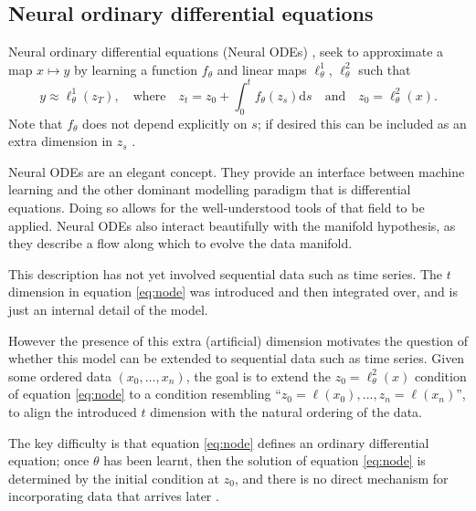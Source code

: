 \documentclass{article}
\theoremstyle{plain}
\theoremstyle{definition}
\begin{document}
	\subsection{Neural ordinary differential equations}
	Neural ordinary differential equations (Neural ODEs) \cite{E2017, neural-odes}, seek to approximate a map $x \mapsto y$ by learning a function $f_\theta$ and linear maps $\ell^1_\theta$, $\ell^2_\theta$ such that
	\begin{equation}\label{eq:node}
	y \approx \ell^1_\theta(z_T),\quad\text{where}\quad z_t = z_0 + \int_0^t f_\theta(z_s) \mathrm{d} s\quad\text{and}\quad z_0 = \ell^2_\theta(x).
	\end{equation}
	Note that $f_\theta$ does not depend explicitly on $s$; if desired this can be included as an extra dimension in $z_s$ \cite[Appendix B.2]{neural-odes}.
	
	Neural ODEs are an elegant concept. They provide an interface between machine learning and the other dominant modelling paradigm that is differential equations. Doing so allows for the well-understood tools of that field to be applied. Neural ODEs also interact beautifully with the manifold hypothesis, as they describe a flow along which to evolve the data manifold.
	
	This description has not yet involved sequential data such as time series. The $t$ dimension in equation \eqref{eq:node} was introduced and then integrated over, and is just an internal detail of the model.
	
	However the presence of this extra (artificial) dimension motivates the question of whether this model can be extended to sequential data such as time series. Given some ordered data $(x_0, \ldots, x_n)$, the goal is to extend the $z_0 = \ell^2_\theta(x)$ condition of equation \eqref{eq:node} to a condition resembling ``$z_0 = \ell(x_0), \ldots, z_n = \ell(x_n)$'', to align the introduced $t$ dimension with the natural ordering of the data.
	
	The key difficulty is that equation \eqref{eq:node} defines an ordinary differential equation; once $\theta$ has been learnt, then the solution of equation \eqref{eq:node} is determined by the initial condition at $z_0$, and there is no direct mechanism for incorporating data that arrives later \cite{nais-net}.%
	
	
\end{document}
